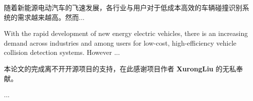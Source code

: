 \documentclass{hnie-thesis}
\begin{document}
\makehniecover
\makehnieintegrity
\hniemaketoc

\hniebeginabstracts
\begin{cnabstract}
随着新能源电动汽车的飞速发展，各行业与用户对于低成本高效的车辆碰撞识别系统的需求越来越高。然而...

\end{cnabstract}

\begin{enabstract}
With the rapid development of new energy electric vehicles, there is an increasing demand across industries and among users for low-cost, high-efficiency vehicle collision detection systems. However ...

\end{enabstract}

\hniebodymatter




\begin{hnieacknowledgements}
本论文的完成离不开开源项目\cite{XurongLiu2026HNIETemplate}的支持，在此感谢项目作者 \textbf{XurongLiu} 的无私奉献。

...
\end{hnieacknowledgements}
\end{document}
